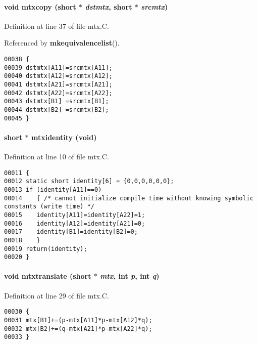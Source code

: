 \paragraph{\setlength{\rightskip}{0pt plus 5cm}void mtxcopy (short $\ast$ {\em dstmtx}, short $\ast$ {\em srcmtx})}\hfill



Definition at line 37 of file mtx.C.

Referenced by {\bf mkequivalencelist}().\small\begin{verbatim}00038 {
00039 dstmtx[A11]=srcmtx[A11];
00040 dstmtx[A12]=srcmtx[A12];
00041 dstmtx[A21]=srcmtx[A21];
00042 dstmtx[A22]=srcmtx[A22];
00043 dstmtx[B1] =srcmtx[B1];
00044 dstmtx[B2] =srcmtx[B2];
00045 }
\end{verbatim}\normalsize 
\label{mtx.C_a0}
\paragraph{\setlength{\rightskip}{0pt plus 5cm}short $\ast$ mtxidentity (void)}\hfill



Definition at line 10 of file mtx.C.\small\begin{verbatim}00011 {
00012 static short identity[6] = {0,0,0,0,0,0};
00013 if (identity[A11]==0)
00014    { /* cannot initialize compile time without knowing symbolic constants (write time) */
00015    identity[A11]=identity[A22]=1;
00016    identity[A12]=identity[A21]=0;
00017    identity[B1]=identity[B2]=0;
00018    }
00019 return(identity);
00020 }
\end{verbatim}\normalsize 
\label{mtx.C_a1}
\paragraph{\setlength{\rightskip}{0pt plus 5cm}void mtxtranslate (short $\ast$ {\em mtx}, int {\em p}, int {\em q})}\hfill



Definition at line 29 of file mtx.C.\small\begin{verbatim}00030 {
00031 mtx[B1]+=(p-mtx[A11]*p-mtx[A12]*q);
00032 mtx[B2]+=(q-mtx[A21]*p-mtx[A22]*q);
00033 }
\end{verbatim}\normalsize 
